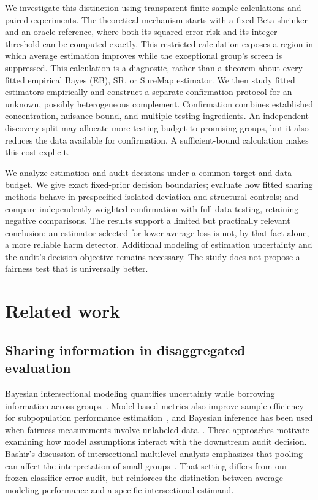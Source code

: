 \documentclass[Afour,sageh,times,doublespace]{sagej}
\begin{document}
We investigate this distinction using transparent finite-sample calculations and paired experiments. The theoretical mechanism starts with a fixed Beta shrinker and an oracle reference, where both its squared-error risk and its integer threshold can be computed exactly. This restricted calculation exposes a region in which average estimation improves while the exceptional group's screen is suppressed. This calculation is a diagnostic, rather than a theorem about every fitted empirical Bayes (EB), SR, or SureMap estimator. We then study fitted estimators empirically and construct a separate confirmation protocol for an unknown, possibly heterogeneous complement. Confirmation combines established concentration, nuisance-bound, and multiple-testing ingredients. An independent discovery split may allocate more testing budget to promising groups, but it also reduces the data available for confirmation. A sufficient-bound calculation makes this cost explicit.

We analyze estimation and audit decisions under a common target and data budget. We give exact fixed-prior decision boundaries; evaluate how fitted sharing methods behave in prespecified isolated-deviation and structural controls; and compare independently weighted confirmation with full-data testing, retaining negative comparisons. The results support a limited but practically relevant conclusion: an estimator selected for lower average loss is not, by that fact alone, a more reliable harm detector. Additional modeling of estimation uncertainty and the audit's decision objective remains necessary. The study does not propose a fairness test that is universally better.

\section{Related work}\label{sec:related}
\subsection{Sharing information in disaggregated evaluation}
Bayesian intersectional modeling quantifies uncertainty while borrowing information across groups~\citep{foulds2020bayesian}. Model-based metrics also improve sample efficiency for subpopulation performance estimation~\citep{miller2021modelbased}, and Bayesian inference has been used when fairness measurements involve unlabeled data~\citep{ji2020trust}. These approaches motivate examining how model assumptions interact with the downstream audit decision. Bashir's discussion of intersectional multilevel analysis emphasizes that pooling can affect the interpretation of small groups~\citep{bashir2026reweighting}. That setting differs from our frozen-classifier error audit, but reinforces the distinction between average modeling performance and a specific intersectional estimand.
\end{document}
